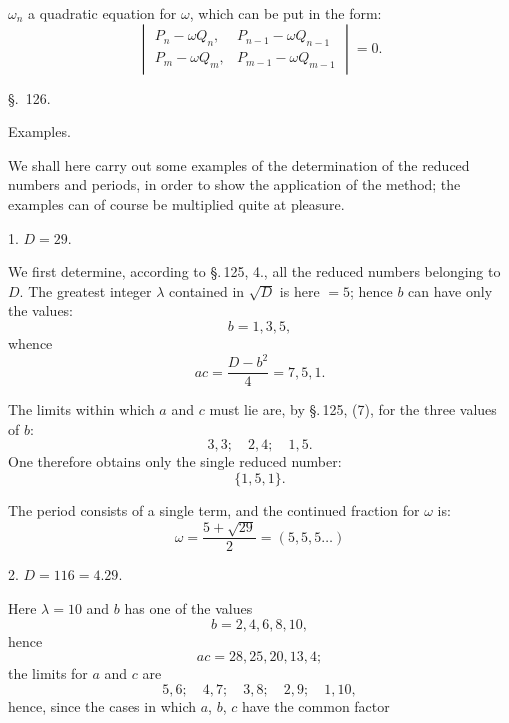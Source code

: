 $\omega_n$ a quadratic equation for $\omega$, which can be put in the form:
\[
\begin{vmatrix} P_n - \omega Q_n, & P_{n-1} - \omega Q_{n-1} \\ P_m - \omega Q_m, & P_{m-1} - \omega Q_{m-1} \end{vmatrix} = 0.
\]

\begin{center}
\S.\ 126.

Examples.
\end{center}

We shall here carry out some examples of the determination of the reduced
numbers and periods, in order to show the application
of the method; the examples can of course be multiplied
quite at pleasure.

1. $D = 29$.

We first determine, according to \S.\,125, 4., all the
reduced numbers belonging to $D$. The greatest integer $\lambda$
contained in $\sqrt{D}$ is here $= 5$; hence $b$ can have only the values:
\[
b = 1, 3, 5,
\]
whence
\[
ac = \frac{D-b^2}{4} = 7, 5, 1.
\]

The limits within which $a$ and $c$ must lie are, by
\S.\,125, (7), for the three values of $b$:
\[
3, 3; \quad 2, 4; \quad 1, 5.
\]
One therefore obtains only the single reduced number:
\[
\{1, 5, 1\}.
\]

The period consists of a single term, and the
continued fraction for $\omega$ is:
\[
\omega = \frac{5+\sqrt{29}}{2} = (5, 5, 5 \ldots)
\]

2. $D = 116 = 4.29$.

Here $\lambda = 10$ and $b$ has one of the values
\[
b = 2, 4, 6, 8, 10,
\]
hence
\[
ac = 28, 25, 20, 13, 4;
\]
the limits for $a$ and $c$ are
\[
5, 6; \quad 4, 7; \quad 3, 8; \quad 2, 9; \quad 1, 10,
\]
hence, since the cases in which $a$, $b$, $c$ have the common factor
